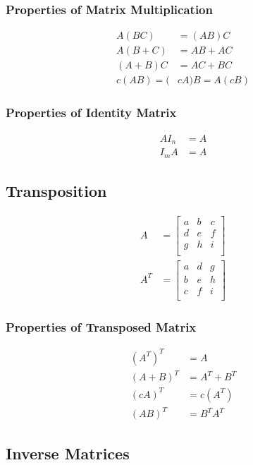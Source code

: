 \documentclass[]{article}
\begin{document}
\subsubsection{Properties of Matrix Multiplication}
	\begin{align}
		A ( BC ) &= ( AB ) C \\
		A ( B + C ) &= AB + AC \\
		( A + B ) C &= AC + BC \\
		c ( AB ) = ( &cA ) B = A ( cB )
	\end{align}
\subsubsection{Properties of Identity Matrix}
	\begin{align}
		AI_{n} &= A \\
		I_{m}A &= A
	\end{align}
\subsection{Transposition}
	\begin{align*}
	A &= 
		\begin{bmatrix}
			a & b & c \\
			d & e & f \\
			g & h & i \\
		\end{bmatrix}
	\\
	A^T &= 
		\begin{bmatrix}
			a & d & g \\
			b & e & h \\
			c & f & i \\
		\end{bmatrix}
	\end{align*}
\subsubsection{Properties of Transposed Matrix}
	\begin{align}
		( A^T )^T &= A \\
		( A + B )^T &= A^T + B^T \\
		( cA )^T &= c ( A^T ) \\
		( AB )^T &= B^T A^T
	\end{align}
\subsection{Inverse Matrices}
\end{document}
